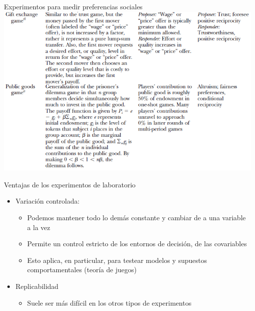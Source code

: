 \documentclass[
  ignorenonframetext,
]{beamer}
\providecommand{\tightlist}{%
  \setlength{\itemsep}{0pt}\setlength{\parskip}{0pt}}
\begin{document}
\begin{frame}{Experimentos para medir preferencias sociales}
\protect\hypertarget{experimentos-para-medir-preferencias-sociales-1}{}
\includegraphics{figs/lab_social_preferences2.png}
\end{frame}

\begin{frame}{Ventajas de los experimentos de laboratorio}
\protect\hypertarget{ventajas-de-los-experimentos-de-laboratorio}{}
\begin{itemize}
\tightlist
\item
  Variación controlada:

  \begin{itemize}
  \tightlist
  \item
    Podemos mantener todo lo demás constante y cambiar de a una variable
    a la vez
  \item
    Permite un control estricto de los entornos de decisión, de las
    covariables
  \item
    Esto aplica, en particular, para testear modelos y supuestos
    comportamentales (teoría de juegos)
  \end{itemize}
\item
  Replicabilidad

  \begin{itemize}
  \tightlist
  \item
    Suele ser más difícil en los otros tipos de experimentos
  \end{itemize}
\end{itemize}
\end{frame}
\end{document}
